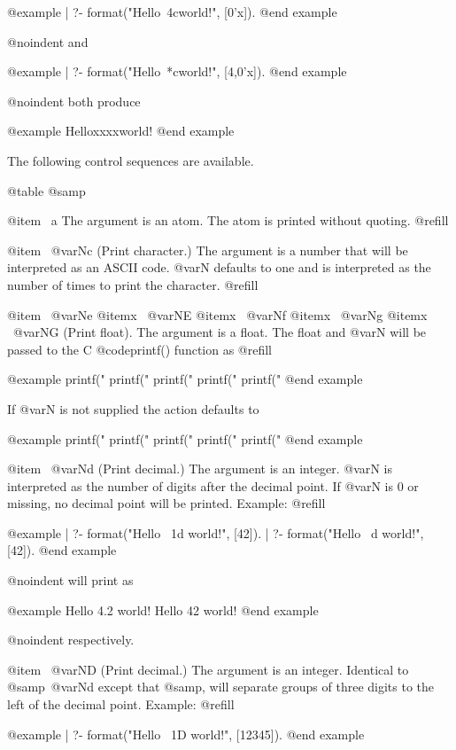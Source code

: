 @example
| ?- format("Hello~4cworld!", [0'x]).
@end example

@noindent
and

@example
| ?- format("Hello~*cworld!", [4,0'x]).
@end example

@noindent
both produce

@example
Helloxxxxworld!
@end example

The following control sequences are available.

@table @samp

@item ~a
The argument is an atom.  The atom is printed without quoting. @refill

@item ~@var{N}c
(Print character.)  The argument is a number that will be interpreted as an
ASCII code. @var{N} defaults to one and is interpreted as the number of
times to print the character. @refill

@item ~@var{N}e
@itemx ~@var{N}E
@itemx ~@var{N}f
@itemx ~@var{N}g
@itemx ~@var{N}G
(Print float).  The argument is a float.  The float and @var{N} will be
passed to the C @code{printf()} function as @refill

@example
printf("%
printf("%
printf("%
printf("%
printf("%
@end example

If @var{N} is not supplied the action defaults to

@example
printf("%
printf("%
printf("%
printf("%
printf("%
@end example

@item ~@var{N}d
(Print decimal.) The argument is an integer. @var{N} is interpreted as the
number of digits after the decimal point.  If @var{N} is 0 or missing, no
decimal point will be printed.  Example: @refill

@example
| ?- format("Hello ~1d world!", [42]).
| ?- format("Hello ~d world!", [42]).
@end example

@noindent
will print as

@example
Hello 4.2 world!
Hello 42 world!
@end example

@noindent
respectively.

@item ~@var{N}D
(Print decimal.) The argument is an integer.  Identical to @samp{~@var{N}d}
except that @samp{,} will separate groups of three digits to the left of the
decimal point.  Example: @refill

@example
| ?- format("Hello ~1D world!", [12345]).
@end example

